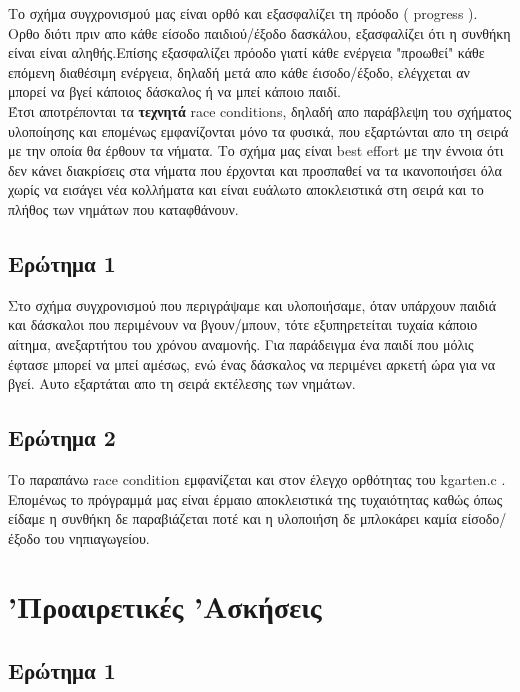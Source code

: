 \documentclass[12pt]{article}
\begin{document}
Το σχήμα συγχρονισμού μας είναι ορθό και εξασφαλίζει τη πρόοδο ( \textlatin{progress} ). Ορθο διότι πριν απο κάθε είσοδο παιδιού/έξοδο δασκάλου, εξασφαλίζει ότι η συνθήκη είναι είναι αληθής.Επίσης εξασφαλίζει πρόοδο γιατί κάθε ενέργεια "προωθεί" κάθε επόμενη διαθέσιμη ενέργεια, δηλαδή μετά απο κάθε έισοδο/έξοδο, ελέγχεται αν μπορεί να βγεί κάποιος δάσκαλος ή να μπεί κάποιο παιδί. \\
Έτσι αποτρέπονται τα \textbf{τεχνητά} \textlatin{race conditions}, δηλαδή απο παράβλεψη του σχήματος υλοποίησης και επομένως εμφανίζονται μόνο τα φυσικά, που εξαρτώνται απο τη σειρά με την οποία θα έρθουν τα νήματα. Το σχήμα μας είναι \textlatin{best effort} με την έννοια ότι δεν κάνει διακρίσεις στα νήματα που έρχονται και προσπαθεί να τα ικανοποιήσει όλα χωρίς να εισάγει νέα κολλήματα και είναι ευάλωτο αποκλειστικά στη σειρά και το πλήθος των νημάτων που καταφθάνουν.




\subsection*{Ερώτημα 1}

Στο σχήμα συγχρονισμού που περιγράψαμε και υλοποιήσαμε, όταν υπάρχουν παιδιά και δάσκαλοι που περιμένουν να βγουν/μπουν, τότε εξυπηρετείται τυχαία κάποιο αίτημα, ανεξαρτήτου του χρόνου αναμονής.
Για παράδειγμα ένα παιδί που μόλις έφτασε μπορεί να μπεί αμέσως, ενώ ένας δάσκαλος να περιμένει αρκετή ώρα για να βγεί. Αυτο εξαρτάται απο τη σειρά εκτέλεσης των νημάτων.

\subsection*{Ερώτημα 2}

Το παραπάνω \textlatin{race condition} εμφανίζεται και στον έλεγχο ορθότητας του \textlatin{kgarten.c} . Επομένως το πρόγραμμά μας είναι έρμαιο αποκλειστικά της τυχαιότητας καθώς όπως είδαμε η συνθήκη δε παραβιάζεται ποτέ και η υλοποιήση δε μπλοκάρει καμία είσοδο/έξοδο του νηπιαγωγείου.



\section*{'Προαιρετικές 'Ασκήσεις}

\subsection*{Ερώτημα 1}
\end{document}
